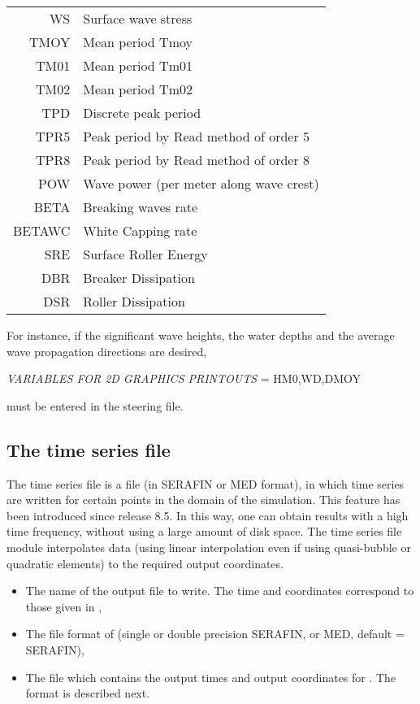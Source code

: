 \begin{longtable}{rl}
WS &  Surface wave stress  \\
TMOY  &  Mean period Tmoy  \\
TM01  &  Mean period Tm01  \\
TM02  &  Mean period Tm02  \\
TPD  &  Discrete peak period  \\
TPR5  &  Peak period by Read method of order 5  \\
TPR8  &  Peak period by Read method of order 8  \\
POW  &  Wave power (per meter along wave crest)  \\
BETA &  Breaking waves rate \\
BETAWC & White Capping rate \\
SRE & Surface Roller Energy \\
DBR & Breaker Dissipation \\
DSR & Roller Dissipation \\
%
\end{longtable}


For instance, if the significant wave heights, the water depths and the average wave
propagation directions are desired,

 \textit{VARIABLES FOR 2D GRAPHICS PRINTOUTS }= HM0,WD,DMOY

 must be entered in the steering file.


\subsection{ The time series file}
The time series file is a file (in SERAFIN or MED format), in which time series
are written for certain points in the domain of the simulation.
This feature has been introduced since release 8.5.
In this way, one can obtain results with a high time frequency, without using
a large amount of disk space.
The time series file module interpolates data (using linear interpolation
even if using quasi-bubble or quadratic elements)
to the required output coordinates.
\begin{itemize}
\item {} The name of the output file to write.
The time and coordinates correspond to those given in
,
\item {} The file format of
 (single or double precision SERAFIN, or MED,
default = SERAFIN),
\item {} The file which contains the output
times and output coordinates for .
The format is described next.
\end{itemize}

